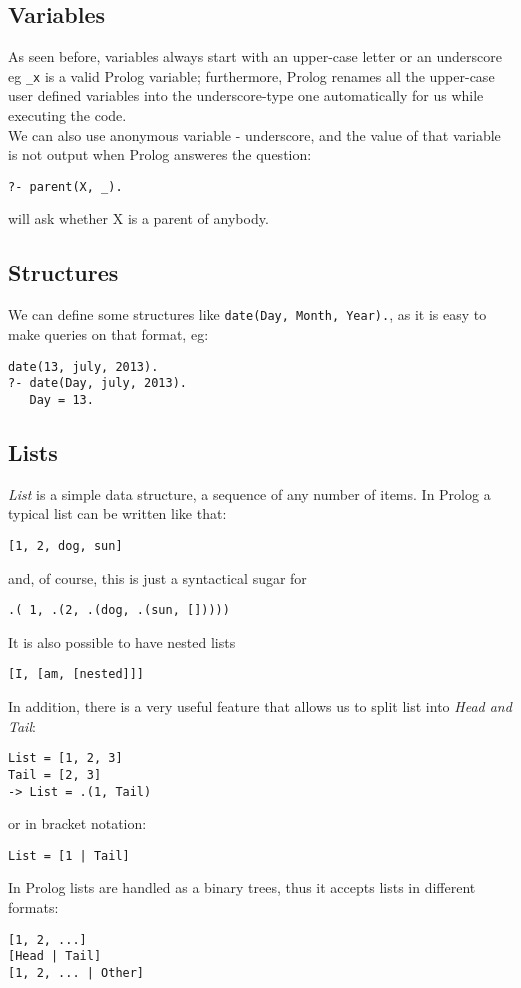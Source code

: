 \documentclass[11pt]{article}
\begin{document}
\subsection{Variables}
As seen before, variables always start with an upper-case letter or an underscore eg \texttt{\_x} is a valid Prolog variable; furthermore, Prolog renames all the upper-case user defined variables into the underscore-type one automatically for us while executing the code.\\
We can also use anonymous variable - underscore, and the value of that variable is not output when Prolog answeres the question:
\begin{lstlisting}
?- parent(X, _).
\end{lstlisting}
will ask whether X is a parent of anybody.

\subsection{Structures}
We can define some structures like \texttt{date(Day, Month, Year).}, as it is easy to make queries on that format, eg:
\begin{lstlisting}
date(13, july, 2013).
?- date(Day, july, 2013).
   Day = 13.
\end{lstlisting}

\subsection{Lists}
\emph{List} is a simple data structure, a sequence of any number of items. In Prolog a typical list can be written like that: 
\begin{lstlisting}
[1, 2, dog, sun]
\end{lstlisting}
and, of course, this is just a syntactical sugar for 
\begin{lstlisting}
.( 1, .(2, .(dog, .(sun, []))))
\end{lstlisting} 
It is also possible to have nested lists
\begin{lstlisting}
[I, [am, [nested]]]
\end{lstlisting}
In addition, there is a very useful feature that allows us to split list into \emph{Head and Tail}:
\begin{lstlisting}
List = [1, 2, 3]
Tail = [2, 3]
-> List = .(1, Tail)
\end{lstlisting}
or in bracket notation:
\begin{lstlisting}
List = [1 | Tail]
\end{lstlisting}
In Prolog lists are handled as a binary trees, thus it accepts lists in different formats:
\begin{lstlisting}
[1, 2, ...]
[Head | Tail]
[1, 2, ... | Other]
\end{lstlisting}
\end{document}

